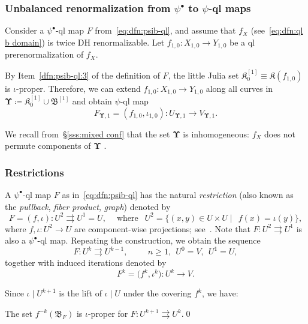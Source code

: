 \documentclass{amsart}
\newcommand{\filled}{{\mathfrak K }}
\newcommand{\bush}{{\mathfrak B }}
\newcommand{\bbush}{{\boldsymbol {\mathfrak B} }}
\newcommand{\bUpsilon}{{\boldsymbol {\Upsilon} }}
\renewcommand{\sp}{{\ \ }}
\newcommand{\1}{{\mathbb 1 }}
\begin{document}
\subsubsection{Unbalanced renormalization from $\psi^\bullet$ to $\psi$-ql maps}\label{sss: psi^b to psi} Consider a $\psi^\bullet$-ql map $F$ from~\eqref{eq:dfn:psib-ql}, and assume that $f_X$ (see~\eqref{eq:dfn:ql b domain}) is twice DH renormalizable. Let $f_{1,0}\colon X_{1,0}\to Y_{1,0}$ be a ql prerenormalization of $f_X$. 

By Item~\ref{dfn:psib-ql:3} of the definition of $F$, the little Julia set $\filled^{[1]}_{0}\equiv \filled(f_{1,0})$ is $\iota$-proper. Therefore, we can extend $f_{1,0}\colon X_{1,0}\to Y_{1,0}$ along all curves in $\bUpsilon\coloneqq \filled^{[1]}_{0}\cup \bbush^{[1]}$ and obtain $\psi$-ql map 
\begin{equation}
\label{eq:F^Ups} F_{\bUpsilon,1} = (f_{1,0},\iota_{1,0})\colon U _{\bUpsilon,1}\to V_{\bUpsilon,1}.
\end{equation}
 
We recall from~\S\ref{sss:mixed conf} that the set $\bUpsilon$ is inhomogeneous: $f_X$ does not permute components of $\bUpsilon$ .



\subsubsection{Restrictions}\label{sss:FibProd} A $\psi^\bullet$-ql map $F$ as in~\eqref{eq:dfn:psib-ql} has the natural \emph{restriction} (also known as the \emph{pullback}, \emph{fiber product}, \emph{graph}) denoted by 
\[F=(f,\iota)\colon U^2\rightrightarrows  U^1=U,\sp\sp \text{ where }\sp U^2=\{(x,y)\in U\times U\mid\sp f(x)=\iota(y)\},\]
where $f,\iota\colon U^2\to U$ are component-wise projections; see~\cite[\S2.2.2]{K}. Note that $F\colon U^2\rightrightarrows  U^1$ is also a $\psi^\bullet$-ql map. Repeating the construction, we obtain the sequence
\[F\colon U^k\rightrightarrows U^{k-1},\hspace{1cm} n\ge 1, \sp U^0=V ,\sp U^1=U,\]
together with induced iterations denoted by
\begin{equation}
\label{eq:F^k}
 F^k = \big(f^k, \iota^k\big) \colon U^k \to V.
\end{equation}  

Since $\iota\mid U^{k+1}$ is the lift of $\iota\mid U$ under the covering $f^k$, we have:

\begin{lem}
\label{lem:iota proper:preim}
The set $f^{-k}(\bush_F)$ is $\iota$-proper for $F\colon U^{k+1}\rightrightarrows U^k$.\qed
\end{lem}
\end{document}
